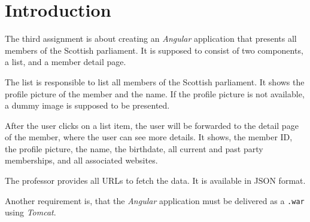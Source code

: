 \section{Introduction}\label{sec:01_intro}
The third assignment is about creating an \textit{Angular} application that presents all members of the Scottish parliament.
It is supposed to consist of two components, a list, and a member detail page.

The list is responsible to list all members of the Scottish parliament. It shows the profile picture of the member and the name. If the profile picture is not available, a dummy image is supposed to be presented.

After the user clicks on a list item, the user will be forwarded to the detail page of the member, where the user can see more details. It shows, the member ID, the profile picture, the name, the birthdate, all current and past party memberships, and all associated websites.

The professor provides all URLs to fetch the data. It is available in JSON format.


Another requirement is, that the \textit{Angular} application must be delivered as a \texttt{.war} using \textit{Tomcat}.

